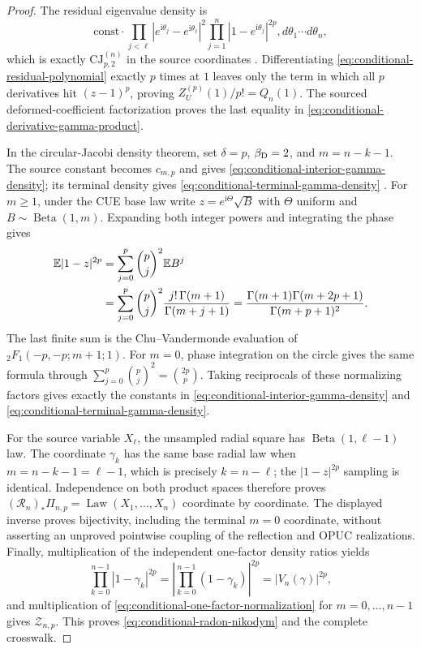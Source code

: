 \begin{sloppypar}
\begin{proof}
The residual eigenvalue density is
\begin{equation}
 \mathrm{const}\cdot
 \prod_{j<\ell}|e^{\mathrm i\theta_j}-e^{\mathrm i\theta_\ell}|^2
 \prod_{j=1}^{n}|1-e^{\mathrm i\theta_j}|^{2p},
 d\theta_1\cdots d\theta_n,
\end{equation}
which is exactly $\mathrm{CJ}^{(n)}_{p,2}$ in the source coordinates
\cite[eq.~(1.2), Def.~2.5, Cor.~4.1]{bourgadeConditionalHaar2009}.  Differentiating
\eqref{eq:conditional-residual-polynomial} exactly $p$ times at $1$ leaves only the
term in which all $p$ derivatives hit $(z-1)^p$, proving
$Z_U^{(p)}(1)/p!=Q_n(1)$.  The sourced deformed-coefficient factorization proves the
last equality in \eqref{eq:conditional-derivative-gamma-product}.

In the circular-Jacobi density theorem, set $\delta=p$, $\beta_{\rm D}=2$, and
$m=n-k-1$.  The source constant becomes $c_{m,p}$ and gives
\eqref{eq:conditional-interior-gamma-density}; its terminal density gives
\eqref{eq:conditional-terminal-gamma-density}
\cite[Thm.~3.1 and eqs.~(3.1)--(3.3)]{bourgadeNikeghbaliRouault2008}.
For $m\geq1$, under the CUE base law write
$z=e^{\mathrm i\Theta}\sqrt B$ with $\Theta$ uniform and
$B\sim\operatorname{Beta}(1,m)$.  Expanding both integer powers and integrating
the phase gives
\begin{align}
 \mathbb E|1-z|^{2p}
 &=\sum_{j=0}^{p}\binom pj^2\mathbb E B^j\notag\\
 &=\sum_{j=0}^{p}\binom pj^2
   \frac{j!\,\Gamma(m+1)}{\Gamma(m+j+1)}
 =\frac{\Gamma(m+1)\Gamma(m+2p+1)}{\Gamma(m+p+1)^2}.
 \label{eq:conditional-one-factor-normalization}
\end{align}
The last finite sum is the Chu--Vandermonde evaluation of
${}_2F_1(-p,-p;m+1;1)$.  For $m=0$, phase integration on the circle gives the same
formula through
$\sum_{j=0}^{p}\binom pj^2=\binom{2p}{p}$.  Taking reciprocals of these
normalizing factors gives exactly the constants in
\eqref{eq:conditional-interior-gamma-density} and
\eqref{eq:conditional-terminal-gamma-density}.

For the source variable $X_\ell$, the unsampled radial square has
$\operatorname{Beta}(1,\ell-1)$ law.  The coordinate $\gamma_k$ has the same base
radial law when $m=n-k-1=\ell-1$, which is precisely
$k=n-\ell$; the $|1-z|^{2p}$ sampling is identical.  Independence on both
product spaces therefore proves
$(\mathcal R_n)_*\Pi_{n,p}=\operatorname{Law}(X_1,\ldots,X_n)$ coordinate by
coordinate.  The displayed inverse proves bijectivity, including the terminal
$m=0$ coordinate, without asserting an unproved pointwise coupling of the
reflection and OPUC realizations.
Finally, multiplication of the independent one-factor density ratios yields
\begin{equation}
 \prod_{k=0}^{n-1}|1-\gamma_k|^{2p}
 =\left|\prod_{k=0}^{n-1}(1-\gamma_k)\right|^{2p}
 =|V_n(\gamma)|^{2p},
\end{equation}
and multiplication of \eqref{eq:conditional-one-factor-normalization} for
$m=0,\ldots,n-1$ gives $\mathcal Z_{n,p}$.  This proves
\eqref{eq:conditional-radon-nikodym} and the complete crosswalk.
\end{proof}


\end{sloppypar}
